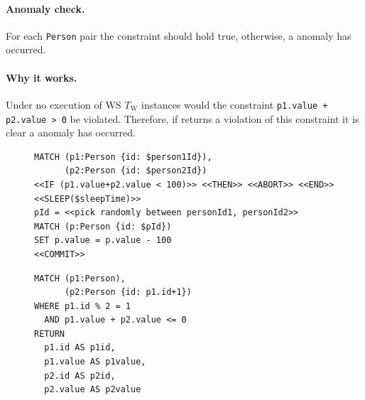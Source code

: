 \paragraph{Anomaly check.}
For each \texttt{Person} pair the constraint should hold true, otherwise, a  anomaly has occurred.

\paragraph{Why it works.}
Under no  execution of WS $T_\mathrm{W}$ instances would the constraint \texttt{p1.value + p2.value > 0} be violated.
Therefore, if  returns a violation of this constraint it is clear a  anomaly has occurred.

\begin{figure}[htb]
\centering
\begin{minipage}{0.55\linewidth}
\begin{lstlisting}[language=cypher,label=fig:ws1,caption=\tx{WS $T_\mathrm{W}$}.]
MATCH (p1:Person {id: $person1Id}),
      (p2:Person {id: $person2Id})
<<IF (p1.value+p2.value < 100)>> <<THEN>> <<ABORT>> <<END>>
<<SLEEP($sleepTime)>>
pId = <<pick randomly between personId1, personId2>>
MATCH (p:Person {id: $pId})
SET p.value = p.value - 100
<<COMMIT>>
\end{lstlisting}
\end{minipage}
\quad
\begin{minipage}{0.33\linewidth}
\begin{lstlisting}[language=cypher,label=fig:ws2,caption=\tx{WS $T_\mathrm{R}$}.]
MATCH (p1:Person),
      (p2:Person {id: p1.id+1})
WHERE p1.id % 2 = 1
  AND p1.value + p2.value <= 0
RETURN
  p1.id AS p1id,
  p1.value AS p1value,
  p2.id AS p2id,
  p2.value AS p2value
\end{lstlisting}
\end{minipage}
\end{figure}



